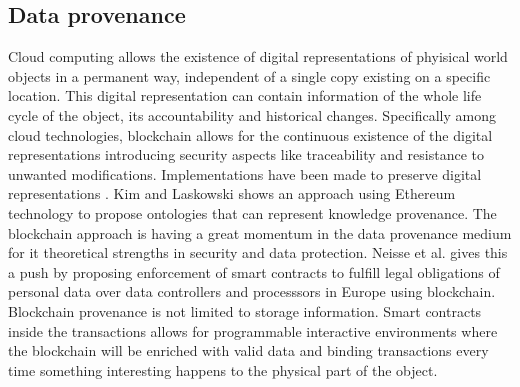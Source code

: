 \subsection{Data provenance}
Cloud computing allows the existence of digital representations of phyisical world objects in a permanent way, independent of a single copy existing on a specific location. This digital representation can contain information of the whole life cycle of the object, its accountability and historical changes. Specifically among cloud technologies, blockchain allows for the continuous existence of the digital representations introducing security aspects like traceability and resistance to unwanted modifications. Implementations have been made to preserve digital representations \cite{provchain}. Kim and Laskowski\cite{ontology} shows an approach using Ethereum technology to propose ontologies that can represent knowledge provenance. The blockchain approach is having a great momentum in the data provenance medium for it theoretical strengths in security and data protection. Neisse et al. \cite{europe} gives this a push by proposing enforcement of smart contracts to fulfill legal obligations of personal data over data controllers and processsors in Europe using blockchain. Blockchain provenance is not limited to storage information. Smart contracts inside the transactions allows for programmable interactive environments \cite{ramachandran} where the blockchain will be enriched with valid data and binding transactions every time something interesting happens to the physical part of the object.